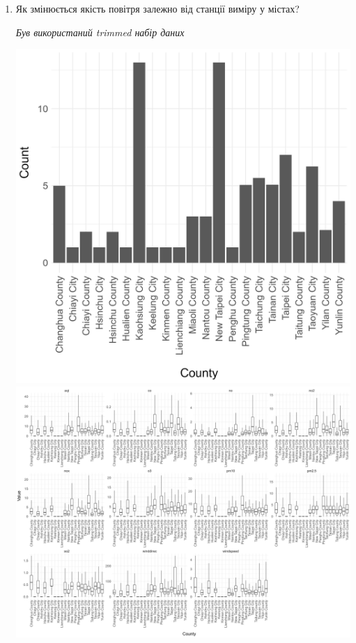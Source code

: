 \documentclass[./report.tex]{subfiles}
\begin{document}
\begin{enumerate}
    
    \item Як змінюється якість повітря залежно від станції виміру у містах?
    
    \quad \textit{Був використаний trimmed набір даних}

    \includegraphics[width=6in]{plots/question7/bar-count.png}
    \includegraphics[width=6in]{plots/question7/box-county.png}

\end{enumerate}
\end{document}
